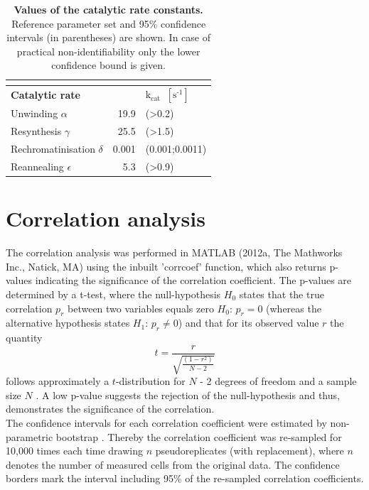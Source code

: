 \begin{table}[H]
	
\begin{center}
	\begin{tabular}{lrl}
		
		\multicolumn{3}{l}{} \\
		\hline
		\textbf{Catalytic rate}    && \textbf{$\text{k}_{\text{cat}}$ $\, \left[\text{s}^{\text{-1}}\right]$}  \\
		\hline
		Unwinding  $\alpha$                                     & 19.9& (>0.2)                 \\
		Resynthesis $\gamma$                                 & 25.5 &(>1.5)     \\
		Rechromatinisation $\delta$                         & 0.001 &(0.001;0.0011)                   \\
		Reannealing  $\epsilon$                                & 5.3&(>0.9)    \\
		\hline
	\end{tabular}
	\caption{\textbf{Values of the catalytic rate constants.}  Reference parameter set and 95\% confidence intervals (in parentheses) are shown. In case of practical non-identifiability only the lower confidence bound is given.}
	\label{tab:parameter_catalyticRates}
	\end{center}
\end{table}


\section{Correlation analysis}
\label{apendix:correlationAnalysis}
The correlation analysis was performed in MATLAB (2012a, The Mathworks Inc., Natick, MA) using the inbuilt 'corrcoef' function, which also returns p-values indicating the significance of the correlation coefficient. The p-values are determined by a t-test, where the null-hypothesis $H_0$ states that the true correlation $p_r$ between two variables equals zero $H_0: \, p_r=0$ (whereas the alternative hypothesis states $H_1: \, p_r\neq0$) and that for its observed value $r$ the quantity 
\begin{equation}
t = \frac{r}{\sqrt{\frac{(1-r^2)}{N-2}}}
\end{equation}     
follows approximately a $t$-distribution for $N$ - 2 degrees of freedom and a sample size $N$ \cite{Kendall1979,Fisher1958}. A low p-value suggests the rejection of the null-hypothesis and thus, demonstrates the significance of the correlation.\\
The confidence intervals for each correlation coefficient were estimated by non-parametric bootstrap \cite{Efron1979}. Thereby the correlation coefficient was re-sampled for 10,000 times each time drawing $n$ pseudoreplicates (with replacement), where $n$ denotes the number of measured cells from the original data. The confidence borders mark the interval including 95\% of the re-sampled correlation coefficients.\\ 

